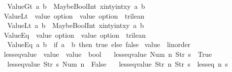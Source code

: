 \begin{isabellebody}
\ \ {\isachardoublequoteopen}ValueGt\ a\ b\ {\isasymequiv}\ MaybeBoolInt\ {\isacharparenleft}{\isasymlambda}x{\isacharcolon}{\isacharcolon}int{\isachardot}{\isasymlambda}y{\isacharcolon}{\isacharcolon}int{\isachardot}{\isacharparenleft}x{\isachargreater}y{\isacharparenright}{\isacharparenright}\ a\ b{\isachardoublequoteclose}\isanewline
\isanewline
{}\isamarkupfalse%
\ ValueLt\ {\isacharcolon}{\isacharcolon}\ {\isachardoublequoteopen}value\ option\ {\isasymRightarrow}\ value\ option\ {\isasymRightarrow}\ trilean{\isachardoublequoteclose}\ \ \isanewline
\ \ {\isachardoublequoteopen}ValueLt\ a\ b\ {\isasymequiv}\ MaybeBoolInt\ {\isacharparenleft}{\isasymlambda}x{\isacharcolon}{\isacharcolon}int{\isachardot}{\isasymlambda}y{\isacharcolon}{\isacharcolon}int{\isachardot}{\isacharparenleft}x{\isacharless}y{\isacharparenright}{\isacharparenright}\ a\ b{\isachardoublequoteclose}\isanewline
\isanewline
{}\isamarkupfalse%
\ ValueEq\ {\isacharcolon}{\isacharcolon}\ {\isachardoublequoteopen}value\ option\ {\isasymRightarrow}\ value\ option\ {\isasymRightarrow}\ trilean{\isachardoublequoteclose}\ \ \isanewline
\ \ {\isachardoublequoteopen}ValueEq\ a\ b\ {\isasymequiv}\ {\isacharparenleft}if\ a\ {\isacharequal}\ b\ then\ true\ else\ false{\isacharparenright}{\isachardoublequoteclose}\isanewline
\isanewline
{}\isamarkupfalse%
\ {\isachardoublequoteopen}value{\isachardoublequoteclose}\ {\isacharcolon}{\isacharcolon}\ linorder\ \isanewline
{}\isamarkupfalse%
\ less{\isacharunderscore}eq{\isacharunderscore}value\ {\isacharcolon}{\isacharcolon}\ {\isachardoublequoteopen}value\ {\isasymRightarrow}\ value\ {\isasymRightarrow}\ bool{\isachardoublequoteclose}\ \isanewline
\ \ {\isachardoublequoteopen}less{\isacharunderscore}eq{\isacharunderscore}value\ {\isacharparenleft}Num\ n{\isacharparenright}\ {\isacharparenleft}Str\ s{\isacharparenright}\ {\isacharequal}\ True{\isachardoublequoteclose}\ {\isacharbar}\isanewline
\ \ {\isachardoublequoteopen}less{\isacharunderscore}eq{\isacharunderscore}value\ {\isacharparenleft}Str\ s{\isacharparenright}\ {\isacharparenleft}Num\ n{\isacharparenright}\ {\isacharequal}\ False{\isachardoublequoteclose}\ {\isacharbar}\isanewline
\ \ {\isachardoublequoteopen}less{\isacharunderscore}eq{\isacharunderscore}value\ {\isacharparenleft}Str\ n{\isacharparenright}\ {\isacharparenleft}Str\ s{\isacharparenright}\ {\isacharequal}\ less{\isacharunderscore}eq\ n\ s{\isachardoublequoteclose}\ {\isacharbar}\isanewline

\end{isabellebody}
